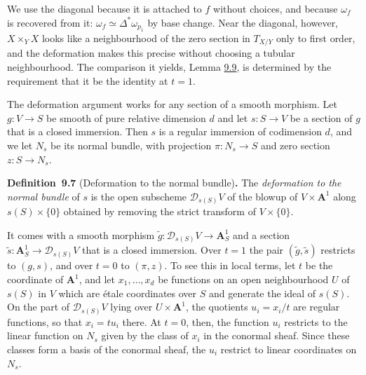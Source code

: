 \documentclass[11pt]{article}
\newenvironment{bpstatement}[2]{\par\addvspace{0.6\baselineskip}\noindent\textbf{#1}#2\textbf{.}\enspace\ignorespaces}
  {\par\addvspace{0.4\baselineskip}}
\begin{document}
We use the diagonal because it is attached to \(f\) without choices, and because \(\omega_f\) is recovered from it: \(\omega_f\simeq\Delta^*\omega_{p_1}\) by base change. Near the diagonal, however, \(X\times_YX\) looks like a neighbourhood of the zero section in \(T_{X/Y}\) only to first order, and the deformation makes this precise without choosing a tubular neighbourhood. The comparison it yields, Lemma \hyperref[bp29]{9.9}, is determined by the requirement that it be the identity at \(t=1\).

The deformation argument works for any section of a smooth morphism. Let \(g:V\to S\) be smooth of pure relative dimension \(d\) and let \(s:S\to V\) be a section of \(g\) that is a closed immersion. Then \(s\) is a regular immersion of codimension \(d\), and we let \(N_s\) be its normal bundle, with projection \(\pi:N_s\to S\) and zero section \(z:S\to N_s\).

\label{bp26}%
\begin{bpstatement}{Definition~9.7}{ (Deformation to the normal bundle)}
The \emph{deformation to the normal bundle} of \(s\) is the open subscheme \(\mathcal D_{s(S)}V\) of the blowup of \(V\times\mathbf A^1\) along \(s(S)\times\{0\}\) obtained by removing the strict transform of \(V\times\{0\}\).
\end{bpstatement}

\label{bp27}%
It comes with a smooth morphism \(\widetilde g:\mathcal D_{s(S)}V\to\mathbf A^1_S\) and a section \(\widetilde s:\mathbf A^1_S\to\mathcal D_{s(S)}V\) that is a closed immersion. Over \(t=1\) the pair \((\widetilde g,\widetilde s)\) restricts to \((g,s)\), and over \(t=0\) to \((\pi,z)\). To see this in local terms, let \(t\) be the coordinate of \(\mathbf A^1\), and let \(x_1,\ldots,x_d\) be functions on an open neighbourhood \(U\) of \(s(S)\) in \(V\) which are étale coordinates over \(S\) and generate the ideal of \(s(S)\). On the part of \(\mathcal D_{s(S)}V\) lying over \(U\times\mathbf A^1\), the quotients \(u_i=x_i/t\) are regular functions, so that \(x_i=tu_i\) there. At \(t=0\), then, the function \(u_i\) restricts to the linear function on \(N_s\) given by the class of \(x_i\) in the conormal sheaf. Since these classes form a basis of the conormal sheaf, the \(u_i\) restrict to linear coordinates on \(N_s\).
\end{document}
